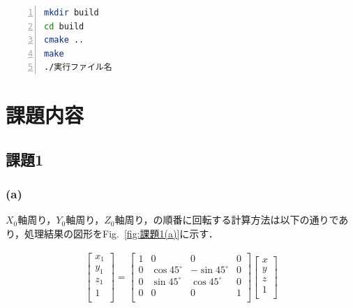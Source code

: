 \documentclass[a4paper,10pt]{jsarticle}
\begin{document}
\begin{lstlisting}[basicstyle=\ttfamily\footnotesize, language=Bash, frame=single, firstnumber=1, numbers=left, breaklines=true]
mkdir build
cd build
cmake ..
make
./実行ファイル名
\end{lstlisting}

\section{課題内容}
\subsection{課題1}
\subsubsection{(a)}
$X_0$軸周り，$Y_0$軸周り，$Z_0$軸周り，の順番に回転する計算方法は以下の通りであり，処理結果の図形をFig.~\ref{fig:課題1(a)}に示す．

\begin{eqnarray}
\label{eq:a}
  \left[
    \begin{array}{c}
      x_1\\
      y_1\\
      z_1\\
      1\\
    \end{array}
  \right] =
  \left[
    \begin{array}{cccc}
      1 & 0 & 0 & 0 \\
      0 & \cos{45^\circ} & -\sin{45^\circ} & 0\\
      0 & \sin{45^\circ} & \cos{45^\circ} & 0\\
      0 & 0 & 0 & 1\\
    \end{array}
  \right]\left[
    \begin{array}{c}
      x\\
      y\\
      z\\
      1\\
    \end{array}
  \right]
\end{eqnarray}
\end{document}
